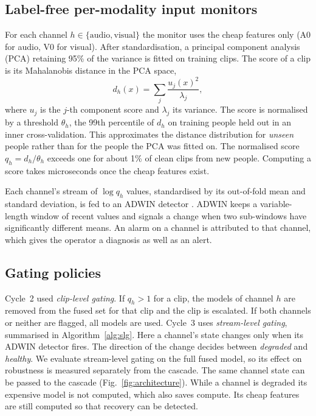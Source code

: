 \subsection{Label-free per-modality input monitors}

For each channel $h\in\{\mathrm{audio},\mathrm{visual}\}$ the monitor uses the cheap features only (A0 for audio, V0 for visual). After standardisation, a principal component analysis (PCA) retaining 95\% of the variance is fitted on training clips. The score of a clip is its Mahalanobis distance in the PCA space,
\begin{equation}
d_h(x)=\sum_{j}\frac{u_j(x)^2}{\lambda_j},
\end{equation}
where $u_j$ is the $j$-th component score and $\lambda_j$ its variance. The score is normalised by a threshold $\theta_h$, the 99th percentile of $d_h$ on training people held out in an inner cross-validation. This approximates the distance distribution for \emph{unseen} people rather than for the people the PCA was fitted on. The normalised score $q_h=d_h/\theta_h$ exceeds one for about 1\% of clean clips from new people. Computing a score takes microseconds once the cheap features exist.

Each channel's stream of $\log q_h$ values, standardised by its out-of-fold mean and standard deviation, is fed to an ADWIN detector \citep{bifet2007}. ADWIN keeps a variable-length window of recent values and signals a change when two sub-windows have significantly different means. An alarm on a channel is attributed to that channel, which gives the operator a diagnosis as well as an alert.

\subsection{Gating policies}

Cycle~2 used \emph{clip-level gating}. If $q_h>1$ for a clip, the models of channel $h$ are removed from the fused set for that clip and the clip is escalated. If both channels or neither are flagged, all models are used. Cycle~3 uses \emph{stream-level gating}, summarised in Algorithm~\ref{alg:slg}. Here a channel's state changes only when its ADWIN detector fires. The direction of the change decides between \emph{degraded} and \emph{healthy}. We evaluate stream-level gating on the full fused model, so its effect on robustness is measured separately from the cascade. The same channel state can be passed to the cascade (Fig.~\ref{fig:architecture}). While a channel is degraded its expensive model is not computed, which also saves compute. Its cheap features are still computed so that recovery can be detected.

